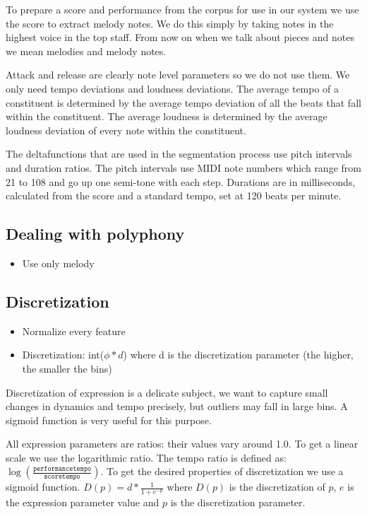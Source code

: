\documentclass[a4paper,10pt]{article}
\begin{document}
To prepare a score and performance from the corpus for use in our system we use the score to extract melody notes. We do this simply by taking notes in the highest voice in the top staff. From now on when we talk about pieces and notes we mean melodies and melody notes.

Attack and release are clearly note level parameters so we do not use them. We only need tempo deviations and loudness deviations. The average tempo of a constituent is determined by the average tempo deviation of all the beats that fall within the constituent. The average loudness is determined by the average loudness deviation of every note within the constituent.

The deltafunctions that are used in the segmentation process use pitch intervals and duration ratios. The pitch intervals use MIDI note numbers which range from 21 to 108 and go up one semi-tone with each step. Durations are in milliseconds, calculated from the score and a standard tempo, set at 120 beats per minute.


\subsection{Dealing with polyphony}
\begin{itemize}
\item Use only melody
\end{itemize}
\subsection{Discretization}

\begin{itemize}
\item Normalize every feature
\item Discretization: int($\phi * d$) where d is the discretization parameter (the higher, the smaller the bins)
\end{itemize}

Discretization of expression is a delicate subject, we want to capture small changes in dynamics and tempo precisely, but outliers may fall in large bins. A sigmoid function is very useful for this purpose. 

All expression parameters are ratios: their values vary around 1.0. To get a linear scale we use the logarithmic ratio. The tempo ratio is defined as: $\log(\frac{\texttt{performancetempo}}{\texttt{scoretempo}})$. To get the desired properties of discretization we use a sigmoid function. $D(p) = d * \frac{1}{1+e^{-p}}$ where $D(p)$ is the discretization of $p$, $e$ is the expression parameter value and $p$ is the discretization parameter.
\end{document}
